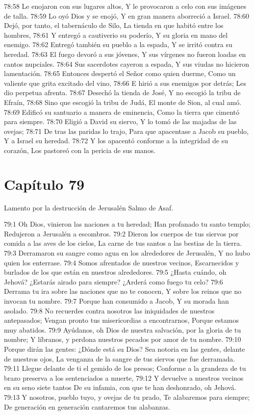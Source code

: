 78:58 Le enojaron con sus lugares altos, 
Y le provocaron a celo con sus imágenes de talla. 
78:59 Lo oyó Dios y se enojó, 
Y en gran manera aborreció a Israel. 
78:60 Dejó, por tanto, el tabernáculo de Silo, 
La tienda en que habitó entre los hombres, 
78:61 Y entregó a cautiverio su poderío, 
Y su gloria en mano del enemigo. 
78:62 Entregó también su pueblo a la espada, 
Y se irritó contra su heredad. 
78:63 El fuego devoró a sus jóvenes, 
Y sus vírgenes no fueron loadas en cantos nupciales. 
78:64 Sus sacerdotes cayeron a espada, 
Y sus viudas no hicieron lamentación. 
78:65 Entonces despertó el Señor como quien duerme, 
Como un valiente que grita excitado del vino, 
78:66 E hirió a sus enemigos por detrás; 
Les dio perpetua afrenta. 
78:67 Desechó la tienda de José, 
Y no escogió la tribu de Efraín, 
78:68 Sino que escogió la tribu de Judá, 
El monte de Sion, al cual amó. 
78:69 Edificó su santuario a manera de eminencia, 
Como la tierra que cimentó para siempre. 
78:70 Eligió a David su siervo, 
Y lo tomó de las majadas de las ovejas; 
78:71 De tras las paridas lo trajo, 
Para que apacentase a Jacob su pueblo, 
Y a Israel su heredad. 
78:72 Y los apacentó conforme a la integridad de su corazón, 
Los pastoreó con la pericia de sus manos. 
\section*{Capítulo 79}
Lamento por la destrucción de Jerusalén 
Salmo de Asaf. 
 
79:1 Oh Dios, vinieron las naciones a tu heredad; 
Han profanado tu santo templo; 
Redujeron a Jerusalén a escombros. 
79:2 Dieron los cuerpos de tus siervos por comida a las aves de los cielos, 
La carne de tus santos a las bestias de la tierra. 
79:3 Derramaron su sangre como agua en los alrededores de Jerusalén, 
Y no hubo quien los enterrase. 
79:4 Somos afrentados de nuestros vecinos, 
Escarnecidos y burlados de los que están en nuestros alrededores. 
79:5 ¿Hasta cuándo, oh Jehová? ¿Estarás airado para siempre? 
¿Arderá como fuego tu celo? 
79:6 Derrama tu ira sobre las naciones que no te conocen, 
Y sobre los reinos que no invocan tu nombre. 
79:7 Porque han consumido a Jacob, 
Y su morada han asolado. 
79:8 No recuerdes contra nosotros las iniquidades de nuestros antepasados; 
Vengan pronto tus misericordias a encontrarnos, 
Porque estamos muy abatidos. 
79:9 Ayúdanos, oh Dios de nuestra salvación, por la gloria de tu nombre; 
Y líbranos, y perdona nuestros pecados por amor de tu nombre. 
79:10 Porque dirán las gentes: ¿Dónde está su Dios? 
Sea notoria en las gentes, delante de nuestros ojos, 
La venganza de la sangre de tus siervos que fue derramada. 
79:11 Llegue delante de ti el gemido de los presos; 
Conforme a la grandeza de tu brazo preserva a los sentenciados a muerte, 
79:12 Y devuelve a nuestros vecinos en su seno siete tantos 
De su infamia, con que te han deshonrado, oh Jehová. 
79:13 Y nosotros, pueblo tuyo, y ovejas de tu prado, 
Te alabaremos para siempre; 
De generación en generación cantaremos tus alabanzas. 
